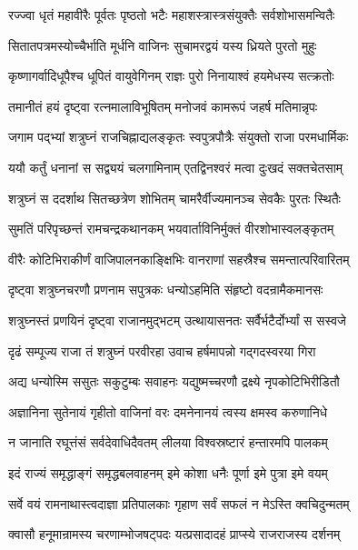 \twolineshloka
{रज्ज्वा धृतं महावीरैः पूर्वतः पृष्ठतो भटैः}
{महाशस्त्रास्त्रसंयुक्तैः सर्वशोभासमन्वितैः}%

\twolineshloka
{सितातपत्रमस्योच्चैर्भाति मूर्धनि वाजिनः}
{सुचामरद्वयं यस्य ध्रियते पुरतो मुहुः}%

\twolineshloka
{कृष्णागर्वादिधूपैश्च धूपितं वायुवेगिनम्}
{राज्ञः पुरो निनायाश्वं हयमेधस्य सत्क्रतोः}%

\twolineshloka
{तमानीतं हयं दृष्ट्वा रत्नमालाविभूषितम्}
{मनोजवं कामरूपं जहर्ष मतिमान्नृपः}%

\twolineshloka
{जगाम पद्भ्यां शत्रुघ्नं राजचिह्नाद्यलङ्कृतः}
{स्वपुत्रपौत्रैः संयुक्तो राजा परमधार्मिकः}%

\twolineshloka
{ययौ कर्तुं धनानां स सद्व्ययं चलगामिनाम्}
{एतद्विनश्वरं मत्वा दुःखदं सक्तचेतसाम्}%

\twolineshloka
{शत्रुघ्नं स ददर्शाथ सितच्छत्रेण शोभितम्}
{चामरैर्वीज्यमानञ्च सेवकैः पुरतः स्थितैः}%

\twolineshloka
{सुमतिं परिपृच्छन्तं रामचन्द्रकथानकम्}
{भयवार्ताविनिर्मुक्तं वीरशोभास्वलङ्कृतम्}%

\twolineshloka
{वीरैः कोटिभिराकीर्णं वाजिपालनकाङ्क्षिभिः}
{वानराणां सहस्रैश्च समन्तात्परिवारितम्}%

\twolineshloka
{दृष्ट्वा शत्रुघ्नचरणौ प्रणनाम सपुत्रकः}
{धन्योऽहमिति संहृष्टो वदन्रामैकमानसः}%

\twolineshloka
{शत्रुघ्नस्तं प्रणयिनं दृष्ट्वा राजानमुद्भटम्}
{उत्थायासनतः सर्वैर्भटैर्दोर्भ्यां स सस्वजे}%

\twolineshloka
{दृढं सम्पूज्य राजा तं शत्रुघ्नं परवीरहा}
{उवाच हर्षमापन्नो गद्गदस्वरया गिरा}%


\twolineshloka
{अद्य धन्योस्मि ससुतः सकुटुम्बः सवाहनः}
{यद्युष्मच्चरणौ द्रक्ष्ये नृपकोटिभिरीडितौ}%

\twolineshloka
{अज्ञानिना सुतेनायं गृहीतो वाजिनां वरः}
{दमनेनानयं त्वस्य क्षमस्व करुणानिधे}%

\twolineshloka
{न जानाति रघूत्तंसं सर्वदेवाधिदैवतम्}
{लीलया विश्वस्रष्टारं हन्तारमपि पालकम्}%

\twolineshloka
{इदं राज्यं समृद्धाङ्गं समृद्धबलवाहनम्}
{इमे कोशा धनैः पूर्णा इमे पुत्रा इमे वयम्}%

\twolineshloka
{सर्वे वयं रामनाथास्त्वदाज्ञा प्रतिपालकाः}
{गृहाण सर्वं सफलं न मेऽस्ति क्वचिदुन्मतम्}%

\twolineshloka
{क्वासौ हनूमान्रामस्य चरणाम्भोजषट्पदः}
{यत्प्रसादादहं प्राप्स्ये राजराजस्य दर्शनम्}%

